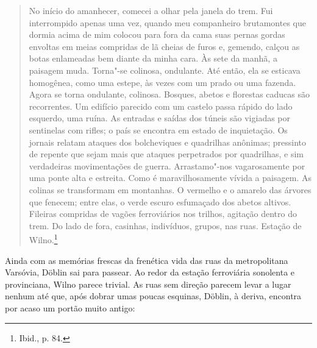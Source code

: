 \begin{quote}
No início do amanhecer, comecei a olhar pela janela do trem. Fui
interrompido apenas uma vez, quando meu companheiro brutamontes que
dormia acima de mim colocou para fora da cama suas pernas gordas
envoltas em meias compridas de lã cheias de furos e, gemendo, calçou as
botas enlameadas bem diante da minha cara. Às sete da manhã, a paisagem
muda. Torna"-se colinosa, ondulante. Até então, ela se esticava
homogênea, como uma estepe, às vezes com um prado ou uma fazenda. Agora
se torna ondulante, colinosa. Bosques, abetos e florestas caducas são
recorrentes. Um edifício parecido com um castelo passa rápido do lado
esquerdo, uma ruína. As entradas e saídas dos túneis são vigiadas por
sentinelas com rifles; o país se encontra em estado de inquietação. Os
jornais relatam ataques dos bolcheviques e quadrilhas anônimas;
pressinto de repente que sejam mais que ataques perpetrados por
quadrilhas, e sim verdadeiras movimentações de guerra. Arrastamo"-nos
vagarosamente por uma ponte alta e estreita. Como é maravilhosamente
vívida a paisagem. As colinas se transformam em montanhas. O vermelho e
o amarelo das árvores que fenecem; entre elas, o verde escuro esfumaçado
dos abetos altivos. Fileiras compridas de vagões ferroviários nos
trilhos, agitação dentro do trem. Do lado de fora, casinhas, indivíduos,
grupos, nas ruas. Estação de Wilno.\footnote{Ibid., p. 84.}
\end{quote}

Ainda com as memórias frescas da frenética vida das ruas da
metropolitana Varsóvia, Döblin sai para passear. Ao redor da estação
ferroviária sonolenta e provinciana, Wilno parece trivial. As ruas sem
direção parecem levar a lugar nenhum até que, após dobrar umas poucas
esquinas, Döblin, à deriva, encontra por acaso um portão muito antigo:

